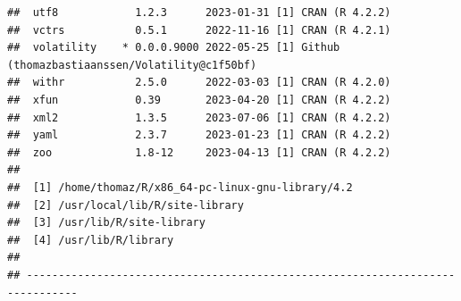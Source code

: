 \documentclass[
]{article}
\begin{document}
\begin{verbatim}
##  utf8            1.2.3      2023-01-31 [1] CRAN (R 4.2.2)
##  vctrs           0.5.1      2022-11-16 [1] CRAN (R 4.2.1)
##  volatility    * 0.0.0.9000 2022-05-25 [1] Github (thomazbastiaanssen/Volatility@c1f50bf)
##  withr           2.5.0      2022-03-03 [1] CRAN (R 4.2.0)
##  xfun            0.39       2023-04-20 [1] CRAN (R 4.2.2)
##  xml2            1.3.5      2023-07-06 [1] CRAN (R 4.2.2)
##  yaml            2.3.7      2023-01-23 [1] CRAN (R 4.2.2)
##  zoo             1.8-12     2023-04-13 [1] CRAN (R 4.2.2)
## 
##  [1] /home/thomaz/R/x86_64-pc-linux-gnu-library/4.2
##  [2] /usr/local/lib/R/site-library
##  [3] /usr/lib/R/site-library
##  [4] /usr/lib/R/library
## 
## ------------------------------------------------------------------------------
\end{verbatim}
\end{document}
